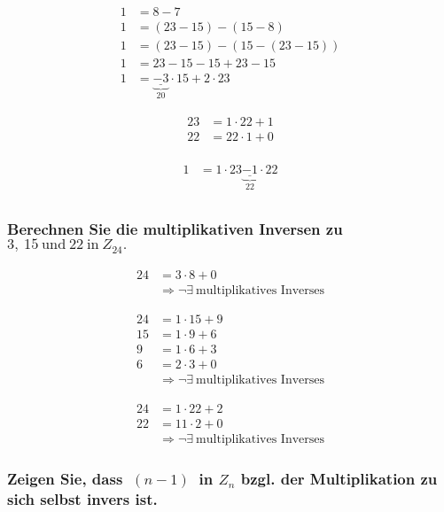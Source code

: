 \begin{align*}
	 1 & = 8 - 7 \\
	 1 & = (23-15) - (15 - 8)        \\
	 1 & = (23-15) - (15 - (23-15))  \\
	 1 & = 23 - 15  - 15 + 23 - 15   \\
	 1 & = \underbrace{\underline{- 3}}_{20} \cdot 15 + 2 \cdot 23 	 	 
\end{align*}

\begin{align*}
	23 & = 1 \cdot 22 + 1 \\
    22 & = 22 \cdot 1 + 0 \\
\end{align*}

\begin{align*}
	 1 & = 1 \cdot 23 \underbrace{ \underline{- 1}}_{22} \cdot 22 \\
\end{align*}

\subsubsection*{Berechnen Sie die multiplikativen Inversen zu $3,~ 15 ~\text{und} ~22 ~\text{in}~ Z_{24}.$}

\begin{align*}
	24 & = 3 \cdot 8 + 0 \\
	&\Rightarrow \neg \exists ~ \text{multiplikatives Inverses}
\end{align*}

\begin{align*}
	24 & = 1 \cdot 15 + 9 \\
 	15 & = 1 \cdot 9 + 6 \\
	9 & = 1 \cdot 6 + 3 \\
	6 & = 2 \cdot 3 + 0 \\
	&\Rightarrow \neg \exists ~ \text{multiplikatives Inverses}
\end{align*}

\begin{align*}
	24 & = 1 \cdot 22 + 2 \\
 	22 & = 11 \cdot 2 + 0 \\
	&\Rightarrow \neg \exists ~ \text{multiplikatives Inverses}
\end{align*}

\subsubsection*{Zeigen Sie, dass $~(n-1)~$ in $Z_n$ bzgl. der Multiplikation zu sich selbst invers ist.}

